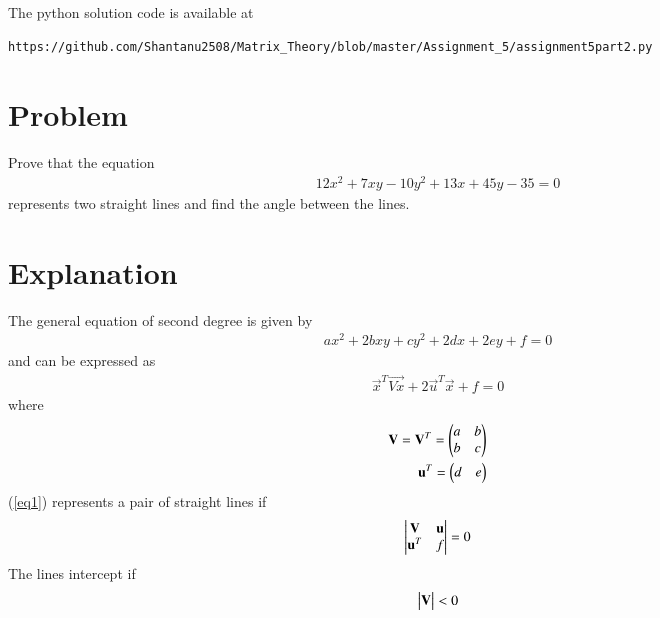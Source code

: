 \documentclass[journal,12pt,twocolumn]{IEEEtran}
\begin{document}
The python solution code is available at
\begin{lstlisting}
https://github.com/Shantanu2508/Matrix_Theory/blob/master/Assignment_5/assignment5part2.py
\end{lstlisting}

\section{Problem}
Prove that the equation
\begin{align*}
	12x^2 + 7xy -10y^2 +13x +45y -35 =0 
\end{align*}
represents two straight lines and find the angle between the lines.
\section{Explanation}
The general equation of second degree is given by
\begin{align}
	ax^2 + 2bxy +cy^2 +2dx +2ey +f =0            \label{eq1}
\end{align}
and can be expressed as
\begin{align}
	\vec{x}^{T}\vec{Vx} + 2\vec{u}^{T}\vec{x} + f=0   \label{eq2}
\end{align}
where
\begin{align}
	\vec{V}=\vec{V}^T=\myvec{a & b \\ b & c}   \label{eq3}  \\
	\vec{u}^T=\myvec{d &  e}            \label{eq4}
\end{align}
(\ref{eq1}) represents a pair of straight lines if
\begin{align}
	\mydet{\vec{V} & \vec{u} \\ \vec{u}^T & f} = 0     \label{eq5} 
\end{align}
The lines intercept if
\begin{align}
	\begin{vmatrix}\mathbf{V}\end{vmatrix} < 0
\end{align}
\end{document}
